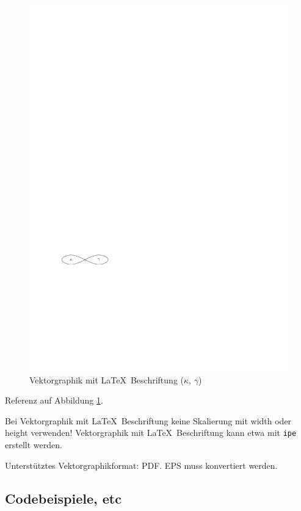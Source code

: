 \begin{figure}[h]
	\centering
	\includegraphics{images/KappaGamma.pdf}
	\caption{
		Vektorgraphik mit \LaTeX\ Beschriftung ($\kappa$, $\gamma$)
	}
	\label{figure:KappaGammaTau}
\end{figure}

Referenz auf Abbildung \ref{figure:KappaGammaTau}.

Bei Vektorgraphik mit \LaTeX\ Beschriftung keine Skalierung mit width
oder height verwenden!
Vektorgraphik mit \LaTeX\ Beschriftung kann etwa mit \texttt{ipe} erstellt
werden.

Unterstütztes Vektorgraphikformat: PDF. EPS muss konvertiert werden.


\subsection{Codebeispiele, etc}
\label{subsection:Coding}

